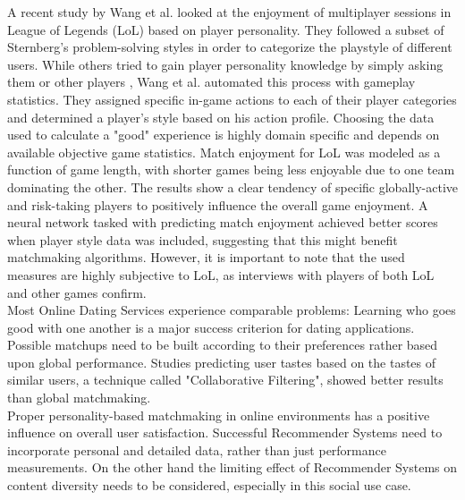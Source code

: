 \documentclass[nochapterpage,bigchapter,linedtoc,longdoc,colorback,accentcolor=tud3b,oneside]{tudreport}
\begin{document}
A recent study by Wang et al. \cite{wang2015thinking} looked at the enjoyment of multiplayer sessions in League of Legends (LoL) based on player personality. They followed a subset of Sternberg's \cite{sternberg1999thinking} problem-solving styles in order to categorize the playstyle of different users. While others tried to gain player personality knowledge by simply asking them \cite{riegelsberger2007personality} or other players \cite{patrick2011system}, Wang et al. automated this process with gameplay statistics. They assigned specific in-game actions to each of their player categories and determined a player's style based on his action profile. Choosing the data used to calculate a "good" experience is highly domain specific and depends on available objective game statistics.\cite{delalleau2012beyond} Match enjoyment for LoL was modeled as a function of game length, with shorter games being less enjoyable due to one team dominating the other.  The results show a clear tendency of specific globally-active and risk-taking players to positively influence the overall game enjoyment. A neural network tasked with predicting match enjoyment achieved better scores when player style data was included, suggesting that this might benefit matchmaking algorithms. However, it is important to note that the used measures are highly subjective to LoL, as interviews with players of both LoL and other games confirm.\\
Most Online Dating Services experience comparable problems: Learning who goes good with one another is a major success criterion for dating applications. Possible matchups need to be built according to their preferences rather based upon global performance. Studies predicting user tastes based on the tastes of similar users, a technique called "Collaborative Filtering", showed better results than global matchmaking. \cite{brozovsky2007recommender}\\
Proper personality-based matchmaking in online environments has a positive influence on overall user satisfaction. Successful Recommender Systems need to incorporate personal and detailed data, rather than just performance measurements. On the other hand the limiting effect of Recommender Systems on content diversity needs to be considered, especially in  this social use case. \cite{nguyen2014exploring}\\
\end{document}
